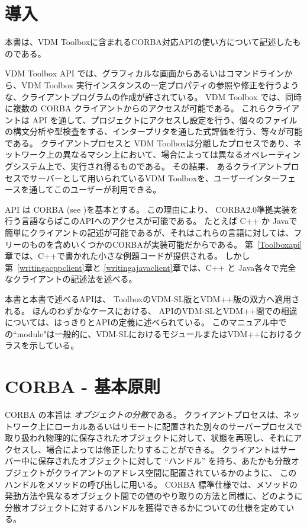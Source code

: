 \documentclass[\pformat,12pt]{jarticle}
\begin{document}

\renewcommand{\thepage}{\roman{page}}

\label{endtofc}
\ifthenelse{\isodd{\pageref{endtofc}}}{\mbox{}\newpage}{}
\newpage 
\renewcommand{\thepage}{\arabic{page}}
\setcounter{page}{1}


\section{導入}
本書は、VDM Toolboxに含まれるCORBA対応APIの使い方について記述したものである。

VDM Toolbox API では、グラフィカルな画面からあるいはコマンドラインから、VDM Toolbox 実行インスタンスの一定プロパティの参照や修正を行うような、クライアントプログラムの作成が許されている。
 VDM Toolbox では、同時に複数の CORBA クライアントからのアクセスが可能である。
これらクライアントは API を通して、プロジェクトにアクセスし設定を行う、個々のファイルの構文分析や型検査をする、インタープリタを通した式評価を行う、等々が可能である。
クライアントプロセスと VDM Toolboxは分離したプロセスであり、ネットワーク上の異なるマシン上において、場合によっては異なるオペレーティングシステム上で、実行され得るものである。
その結果、 あるクライアントプロセスでサーバーとして用いられているVDM Toolboxを、ユーザーインターフェースを通してこのユーザーが利用できる。

 API は CORBA (see \cite{OMG&96})を基本とする。
この理由により、 CORBA2.0準拠実装を行う言語ならばこのAPIへのアクセスが可能である。
たとえば C++ か Javaで簡単にクライアントの記述が可能であるが、それはこれらの言語に対しては、フリーのものを含めいくつかのCORBAが実装可能だからである。
第~\ref{Toolboxapi}章では、C++で書かれた小さな例題コードが提供される。
しかし第~\ref{writingacppclient}章と \ref{writingajavaclient}章では、C++ と Java各々で完全なクライアントの記述法を述べる。

本書と本書で述べるAPIは、 ToolboxのVDM-SL版とVDM++版の双方へ適用される。 
ほんのわずかなケースにおける、 APIのVDM-SLとVDM++間での相違については、はっきりとAPIの定義に述べられている。
このマニュアル中での``module"は一般的に、VDM-SLにおけるモジュールまたはVDM++におけるクラスを示している。

\newpage
\section{CORBA - 基本原則}

CORBA の本旨は {\em オブジェクトの分散}である。
クライアントプロセスは、ネットワーク上にローカルあるいはリモートに配置された別々のサーバープロセスで取り扱われ物理的に保存されたオブジェクトに対して、状態を再現し、それにアクセスし、場合によっては修正したりすることができる。
クライアントはサーバー中に保存されたオブジェクトに対して ``ハンドル'' を持ち、あたかも分散オブジェクトがクライアントのアドレス空間に配置されているかのように、 このハンドルをメソッドの呼び出しに用いる。
 CORBA 標準仕様では、メソッドの発動方法や異なるオブジェクト間での値のやり取りの方法と同様に、どのように分散オブジェクトに対するハンドルを獲得できるかについての仕様を定めている。
\end{document}
